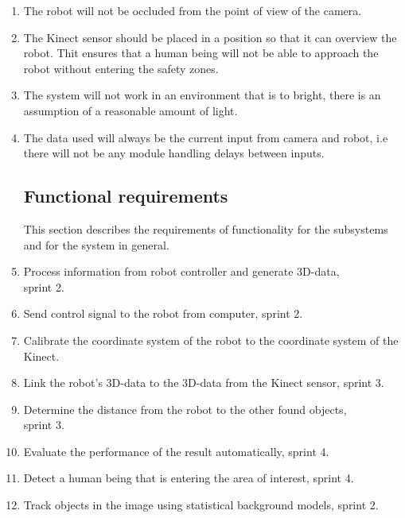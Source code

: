 \documentclass[10pt,a4paper]{article}
\begin{document}
\begin{enumerate}
\item The robot will not be occluded from the point of view of the camera.

\item The Kinect sensor should be placed in a position so that it can overview the robot. Thit ensures that a human being will not be able to approach the robot without entering the safety zones.

\item The system will not work in an environment that is to bright, there is an assumption of a reasonable amount of light.

\item The data used will always be the current input from camera and robot, i.e there will not be any module handling delays between inputs.

\subsection{Functional requirements}
This section describes the requirements of functionality for the subsystems and for the system in general.
\item Process information from robot controller and generate 3D-data, \\sprint 2.
\item Send control signal to the robot from computer, sprint 2.
\item Calibrate the coordinate system of the robot to the coordinate system of the Kinect. 

\item Link the robot's 3D-data to the 3D-data from the Kinect sensor, sprint 3.

\item Determine the distance from the robot to the other found objects, \\sprint 3.

\item Evaluate the performance of the result automatically, sprint 4.

\item Detect a human being that is entering the area of interest, sprint 4.

\item Track objects in the image using statistical background models, sprint 2.


\end{enumerate}
\end{document}
